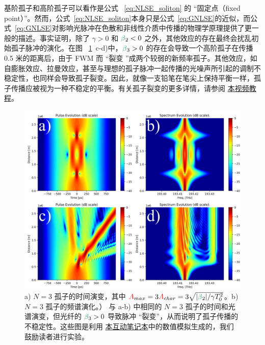 基阶孤子和高阶孤子可以看作是公式 ~\ref{eq:NLSE_soliton} 的 “固定点（fixed point）”。然而，公式~\ref{eq:NLSE_soliton}本身只是公式~\ref{eq:GNLSE}的近似，而公式~\ref{eq:GNLSE}对影响光脉冲在色散和非线性介质中传播的物理学原理提供了更一般的描述。事实证明，除了 $\gamma>0$ 和 $\betag_2<0$ 之外，其他效应的存在最终会扰乱初始孤子脉冲的演化。在图 ~\ref{fig:Soliton_comparison}~c-d)中，$\betag_3>0$ 的存在会导致一个高阶孤子在传播 0.5 米的距离后，由于 FWM 而 “裂变 ”成两个较弱的新频率孤子。其他效应，如自膨胀效应、拉曼效应，甚至与理想的孤子脉冲一起传播的光噪声所引起的调制不稳定性，也同样会导致孤子裂变。因此，就像一支铅笔在笔尖上保持平衡一样，孤子传播应被视为一种不稳定的平衡。有关孤子裂变的更多详情，请参阅 \href{https://youtu.be/tHpIR2Kuxp0}{本视频教程}。
\begin{figure}
    \centering
    \includegraphics[width=1\linewidth]{figures/Soliton_comparison.png}
    \caption{a) $N=3$ 孤子的时间演变，其中 $\A_{max}=3\A_{char}=3\sqrt{|\betag_2|/\gamma T_0^2}$。b) $N=3$ 孤子的频谱演化。） 与 a-b) 中相同的 $N=3$ 孤子的时间和光谱演变，但光纤的 $\betag_3>0$ 导致脉冲 “裂变”，从而说明了孤子传播的不稳定性。这些图是利用 \href{https://colab.research.google.com/drive/123pT-IsLWIEZY9XW3-1WzkTXfg1IEkkD?usp=sharing}{本互动笔记本}中的数值模拟生成的，我们鼓励读者进行实验。}
    \label{fig:Soliton_comparison}
\end{figure}





